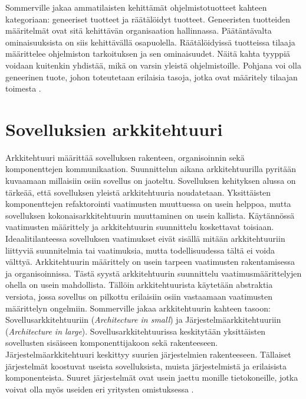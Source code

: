 \documentclass[utf8]{gradu3}
\begin{document}
Sommerville jakaa ammatilaisten kehittämät ohjelmistotuotteet kahteen kategoriaan: geneeriset tuotteet ja räätälöidyt tuotteet. Geneeristen tuotteiden määritelmät ovat sitä kehittävän organisaation hallinnassa. Päätäntävalta ominaisuuksista on siis kehittävällä osapuolella. Räätälöidyissä tuotteissa tilaaja määrittelee ohjelmiston tarkoituksen ja sen ominaisuudet. Näitä kahta tyyppiä voidaan kuitenkin yhdistää, mikä on varsin yleistä ohjelmistoille. Pohjana voi olla geneerinen tuote, johon toteutetaan erilaisia tasoja, jotka ovat määritely tilaajan toimesta \parencite[s.1-10]{Sommerville}.


\section{Sovelluksien arkkitehtuuri}
Arkkitehtuuri määrittää sovelluksen rakenteen, organisoinnin sekä komponenttejen kommunikaation. Suunnittelun aikana arkkitehtuurilla pyritään kuvaamaan millaisiin osiin sovellus on jaoteltu. Sovelluksen kehityksen alussa on tärkeää, että sovelluksen yleistä arkkitehtuuria noudatetaan. Yksittäisten komponenttejen refaktorointi vaatimusten muuttuessa on usein helppoa, mutta sovelluksen kokonaisarkkitehtuurin muuttaminen on usein kallista. Käytännössä vaatimusten määrittely ja arkkitehtuurin suunnittelu koskettavat toisiaan. Ideaalitilanteessa sovelluksen vaatimukset eivät sisällä mitään arkkitehtuuriin liittyviä suunnitelmia tai vaatimuksia, mutta todellisuudessa tältä ei voida välttyä. Arkkitehtuurin määrittely on usein tarpeen vaatimusten rakentamisessa ja organisoinnissa. Tästä syystä arkkitehtuurin suunnittelu vaatimusmäärittelyjen ohella on usein mahdollista. Tällöin arkkitehtuurista käytetään abstraktia versiota, jossa sovellus on pilkottu erilaisiin osiin vastaamaan vaatimusten määrittelyn ongelmiin. Sommerville jakaa arkkitehtuurin kahteen tasoon: Sovellusarkkitehtuuriin (\emph{Architecture in small}) ja Järjestelmäarkkitehtuuriin (\emph{Architecture in large}). Sovellusarkkitehtuurissa keskitytään yksittäisten sovellusten sisäiseen komponenttijakoon sekä rakenteeseen.  Järjestelmäarkkitehtuuri keskittyy suurien järjestelmien rakenteeseen. Tällaiset järjestelmät koostuvat useista sovelluksista, muista järjestelmistä ja erilaisista komponenteista. Suuret järjestelmät ovat usein jaettu monille tietokoneille, jotka voivat olla myös useiden eri yritysten omistuksessa \parencite[s. 148]{Sommerville}.
\end{document}
